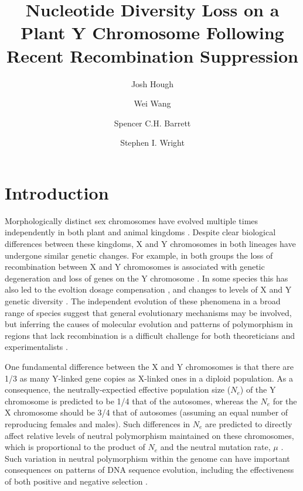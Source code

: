 \documentclass[9pt,twocolumn,twoside]{gsajnl}
\title{Nucleotide Diversity Loss on a Plant Y Chromosome Following Recent Recombination Suppression}
\author[$\ast$,$\dagger$,1]{Josh Hough}
\author[$\dagger$]{Wei Wang}
\author[$\dagger$]{Spencer C.H. Barrett}
\author[$\dagger$]{Stephen I. Wright}
\affil[$\ast$]{Department of Plant Sciences, University of California, Davis}
\affil[$\dagger$]{Department of Ecology and Evolutionary Biology, University of Toronto}
\begin{document}
\maketitle
\thispagestyle{firststyle}
\marginmark
\firstpagefootnote
{}
\vspace{-11pt}

\section*{Introduction}

\lettrine[lines=2]{\color{color2}M}{}orphologically distinct sex chromosomes have evolved multiple times independently in both plant and animal kingdoms \citep{westergaard1958,ohno1967,bull1983,charlesworth1991}. Despite clear biological differences between these kingdoms, X and Y chromosomes in both lineages have undergone similar genetic changes. For example, in both groups the loss of recombination between X and Y chromosomes is associated with genetic degeneration and loss of genes on the Y chromosome \citep{hough2014,bergero2015}. In some species this has also led to the evoltion dosage compensation \citep{charlesworth1996CB,muyle2012,papadopulos2015}, and changes to levels of X and Y genetic diversity \citep{ellegren2011,bachtrog2013NRG}. The independent evolution of these phenomena in a broad range of species suggest that general evolutionary mechanisms may be involved, but inferring the causes of molecular evolution and patterns of polymorphism in regions that lack recombination is a difficult challenge for both theoreticians and experimentalists \citep{charlesworth1978,charlesworth1996CB,charlesworth2000degeneration}.

One fundamental difference between the X and Y chromosomes is that there are 1/3 as many Y-linked gene copies as X-linked ones in a diploid population. As a consequence, the neutrally-expectied effective population size ($N_{e}$) of the Y chromosome is predicted to be 1/4 that of the autosomes, whereas the $N_{e}$ for the X chromosome should be 3/4 that of autosomes (assuming an equal number of reproducing females and males). Such differences in $N_{e}$ are predicted to directly affect relative levels of neutral polymorphism maintained on these chromosomes, which is proportional to the product of $N_{e}$ and the neutral mutation rate, $\mu$ \citep{Kimura1984}. Such variation in neutral polymorphism within the genome can have important consequences on patterns of DNA sequence evolution, including the effectiveness of both positive and negative selection \citep{charlesworth1987}.
\end{document}
